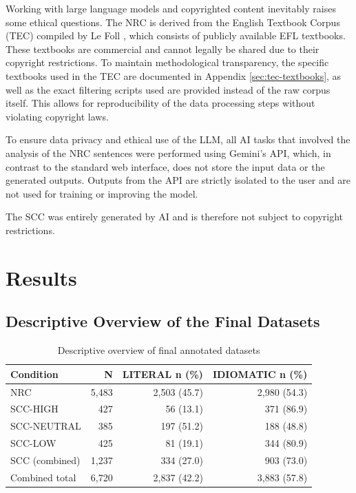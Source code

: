 \documentclass[11pt,a4paper]{article}
\begin{document}
Working with large language models and copyrighted content inevitably raises some ethical questions. The NRC is derived from the English Textbook Corpus (TEC) compiled by Le Foll \parencite*{leFoll2021a}, which consists of publicly available EFL textbooks. These textbooks are commercial and cannot legally be shared due to their copyright restrictions. To maintain methodological transparency, the specific textbooks used in the TEC are documented in Appendix \ref{sec:tec-textbooks}, as well as the exact filtering scripts used are provided instead of the raw corpus itself. This allows for reproducibility of the data processing steps without violating copyright laws.

To ensure data privacy and ethical use of the LLM, all AI tasks that involved the analysis of the NRC sentences were performed using Gemini's API, which, in contrast to the standard web interface, does not store the input data or the generated outputs. Outputs from the API are strictly isolated to the user and are not used for training or improving the model. 

The SCC was entirely generated by AI and is therefore not subject to copyright restrictions. 

\section{Results}\label{sec:results}

\blindtext

\subsection{Descriptive Overview of the Final Datasets}\label{subsec:descriptive-overview}

\blindtext

\begin{table}[htbp]
\centering
\caption[Final Dataset Overview]{Descriptive overview of final annotated datasets}
\label{tab:results-descriptive-overview}
\begin{tabular}{lrrr}
\toprule
\textbf{Condition} & \textbf{N} & \textbf{LITERAL n (\%)} & \textbf{IDIOMATIC n (\%)} \\
\midrule
NRC & 5{,}483 & 2{,}503 (45.7) & 2{,}980 (54.3) \\
SCC-HIGH & 427 & 56 (13.1) & 371 (86.9) \\
SCC-NEUTRAL & 385 & 197 (51.2) & 188 (48.8) \\
SCC-LOW & 425 & 81 (19.1) & 344 (80.9) \\
SCC (combined) & 1{,}237 & 334 (27.0) & 903 (73.0) \\
Combined total & 6{,}720 & 2{,}837 (42.2) & 3{,}883 (57.8) \\
\bottomrule
\end{tabular}
\end{table}
\end{document}
